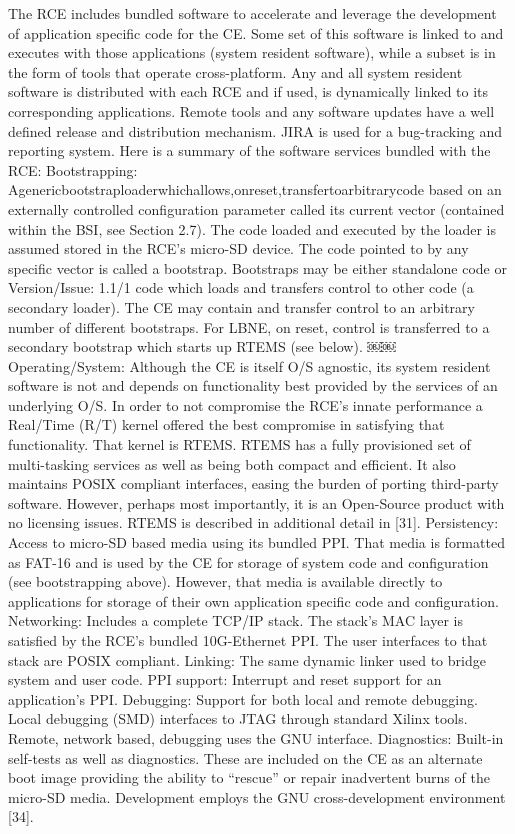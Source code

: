 The RCE includes bundled software to accelerate and leverage the development of application specific code for the CE. Some set of this software is linked to and executes with those applications (system resident software), while a subset is in the form of tools that operate cross-platform. Any and all system resident software is distributed with each RCE and if used, is dynamically linked to its corresponding applications. Remote tools and any software updates have a well defined release and distribution mechanism. JIRA is used for a bug-tracking and reporting system. Here is a summary of the software services bundled with the RCE:
Bootstrapping: Agenericbootstraploaderwhichallows,onreset,transfertoarbitrarycode based on an externally controlled configuration parameter called its current vector (contained within the BSI, see Section 2.7). The code loaded and executed by the loader is assumed stored in the RCE's micro-SD device. The code pointed to by any specific vector is called a bootstrap. Bootstraps may be either standalone code or Version/Issue: 1.1/1
code which loads and transfers control to other code (a secondary loader). The CE may contain and transfer control to an arbitrary number of different bootstraps. For LBNE, on reset, control is transferred to a secondary bootstrap which starts up RTEMS (see below).
￼￼Operating/System: Although the CE is itself O/S agnostic, its system resident software is not and depends on functionality best provided by the services of an underlying O/S. In order to not compromise the RCE's innate performance a Real/Time (R/T) kernel offered the best compromise in satisfying that functionality. That kernel is RTEMS. RTEMS has a fully provisioned set of multi-tasking services as well as being both compact and efficient. It also maintains POSIX compliant interfaces, easing the burden of porting third-party software. However, perhaps most importantly, it is an Open-Source product with no licensing issues. RTEMS is described in additional detail in [31].
Persistency:
Access to micro-SD based media using its bundled PPI. That media is formatted as FAT-16 and is used by the CE for storage of system code and configuration (see bootstrapping above). However, that media is available directly to applications for storage of their own application specific code and configuration.
Networking: Includes a complete TCP/IP stack. The stack's MAC layer is satisfied by the RCE's bundled 10G-Ethernet PPI. The user interfaces to that stack are POSIX compliant.
Linking: The same dynamic linker used to bridge system and user code.
PPI support: Interrupt and reset support for an application's PPI.
Debugging: Support for both local and remote debugging. Local debugging (SMD) interfaces to JTAG through standard Xilinx tools. Remote, network based, debugging uses the GNU interface.
Diagnostics: Built-in self-tests as well as diagnostics. These are included on the CE as an alternate boot image providing the ability to “rescue” or repair inadvertent burns of the micro-SD media.
Development employs the GNU cross-development environment [34].

